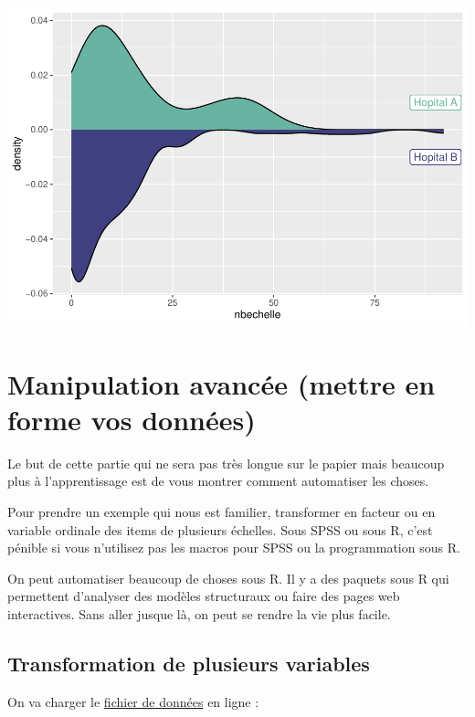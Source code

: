 \documentclass[
]{book}
\begin{document}
\includegraphics{_main_files/figure-latex/unnamed-chunk-83-1.pdf}

\hypertarget{manipulation-avancuxe9e-mettre-en-forme-vos-donnuxe9es}{%
\chapter{Manipulation avancée (mettre en forme vos données)}\label{manipulation-avancuxe9e-mettre-en-forme-vos-donnuxe9es}}

Le but de cette partie qui ne sera pas très longue sur le papier mais beaucoup
plus à l'apprentissage est de vous montrer comment automatiser les choses.

Pour prendre un exemple qui nous est familier, transformer en facteur ou en
variable ordinale des items de plusieurs échelles. Sous SPSS ou sous R, c'est
pénible si vous n'utilisez pas les macros pour SPSS ou la programmation
sous R.

On peut automatiser beaucoup de choses sous R. Il y a des paquets sous
R qui permettent d'analyser des modèles structuraux ou faire des pages web
interactives. Sans aller jusque là, on peut se rendre la vie plus facile.

\hypertarget{transformation-de-plusieurs-variables}{%
\section{Transformation de plusieurs variables}\label{transformation-de-plusieurs-variables}}

On va charger le \href{https://personality-project.org/r/psych/HowTo/scoring.tutorial/small.msq.txt}{fichier de données} en ligne :
\end{document}
